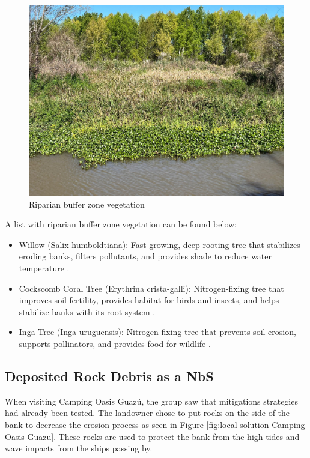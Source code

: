 \begin{figure}[H]
    \centering
    \includegraphics[width=0.5\linewidth]{figures/ch8/riparian.jpg}
    \caption{Riparian buffer zone vegetation}
    \label{fig:riparian zone}
\end{figure}

A list with riparian buffer zone vegetation can be found below:

\begin{itemize}
    \item Willow (Salix humboldtiana): Fast-growing, deep-rooting tree that stabilizes eroding banks, filters pollutants, and provides shade to reduce water temperature \autocite{inaturalistSalixHumboldtiana2020}.
    \item Cockscomb Coral Tree (Erythrina crista-galli): Nitrogen-fixing tree that improves soil fertility, provides habitat for birds and insects, and helps stabilize banks with its root system \autocite{weedsaustraliaCockspurCoralTree2019}.
    \item Inga Tree (Inga uruguensis): Nitrogen-fixing tree that prevents soil erosion, supports pollinators, and provides food for wildlife \autocite{guiadeplantasnativasIngaUraguensisInga2008}.
\end{itemize}


\subsection{Deposited Rock Debris as a NbS}
When visiting Camping Oasis Guazú, the group saw that mitigations strategies had already been tested. The landowner chose to put rocks on the side of the bank to decrease the erosion process as seen in Figure \ref{fig:local solution Camping Oasis Guazu}. These rocks are used to protect the bank from the high tides and wave impacts from the ships passing by.

